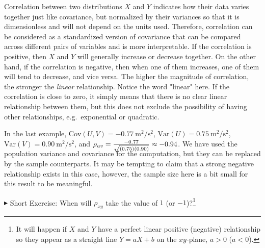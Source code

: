 Correlation between two distributions $X$ and $Y$ indicates how their data varies together just like covariance, but normalized by their variances so that it is dimensionless and will not depend on the units used. Therefore, correlation can be considered as a standardized version of covariance that can be compared across different pairs of variables and is more interpretable. If the correlation is positive, then $X$ and $Y$ will generally increase or decrease together. On the other hand, if the correlation is negative, then when one of them increases, one of them will tend to decrease, and vice versa. The higher the magnitude of correlation, the stronger the \textit{linear} relationship. Notice the word "linear" here. If the correlation is close to zero, it simply means that there is no clear linear relationship between them, but this does not exclude the possibility of having other relationships, e.g.\ exponential or quadratic.\par
In the last example, $\text{Cov}(U,V) = \SI{-0.77}{\square\m \per \square\s}$, $\text{Var}(U) = \SI{0.75}{\square\m \per \square\s}$, $\text{Var}(V) = \SI{0.90}{\square\m \per \square\s}$, and $\rho_{uv} = \smash{\frac{-0.77}{\sqrt{(0.75)(0.90)}}} \approx -0.94$. We have used the population variance and covariance for the computation, but they can be replaced by the sample counterparts. It may be tempting to claim that a strong negative relationship exists in this case, however, the sample size here is a bit small for this result to be meaningful. \par
$\blacktriangleright$ Short Exercise: When will $\rho_{xy}$ take the value of $1$ (or $-1$)?\footnote{It will happen if $X$ and $Y$ have a perfect linear positive (negative) relationship so they appear as a straight line $Y = aX + b$ on the $xy$-plane, $a > 0$ ($a < 0$).}\par

